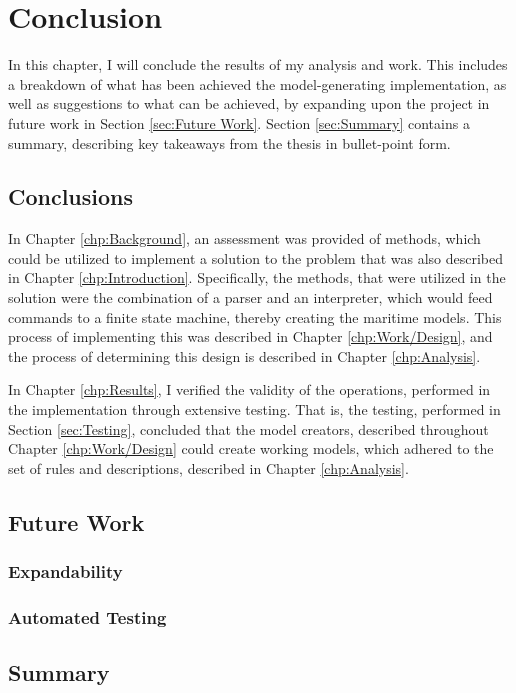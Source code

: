 \chapter{Conclusion}
In this chapter, I will conclude the results of my analysis and work. This includes a breakdown of what has been achieved the model-generating implementation, as well as suggestions to what can be achieved, by expanding upon the project in future work in Section \ref{sec:Future Work}. Section \ref{sec:Summary} contains a summary, describing key takeaways from the thesis in bullet-point form.
\section{Conclusions}
In Chapter \ref{chp:Background}, an assessment was provided of methods, which could be utilized to implement a solution to the problem that was also described in Chapter \ref{chp:Introduction}. Specifically, the methods, that were utilized in the solution were the combination of a parser and an interpreter, which would feed commands to a finite state machine, thereby creating the maritime models. This process of implementing this was described in Chapter \ref{chp:Work/Design}, and the process of determining this design is described in Chapter \ref{chp:Analysis}.

In Chapter \ref{chp:Results}, I verified the validity of the operations, performed in the implementation through extensive testing. That is, the testing, performed in Section \ref{sec:Testing}, concluded that the model creators, described throughout Chapter \ref{chp:Work/Design} could create working models, which adhered to the set of rules and descriptions, described in Chapter \ref{chp:Analysis}. 
\section{Future Work}

\subsection{Expandability}
\subsection{Automated Testing}

\section{Summary}
